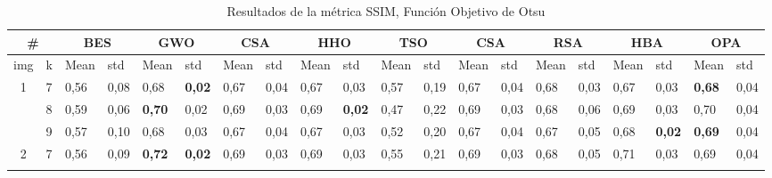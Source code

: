 \documentclass[conference]{IEEEtran}
\begin{document}
\begin{table*}[]
	\caption{Resultados de la métrica SSIM, Función Objetivo de Otsu}
	\begin{tabular}{|cl|ll|ll|ll|ll|ll|ll|ll|ll|ll|}
		\hline
		\multicolumn{2}{|c|}{\#} & \multicolumn{2}{c|}{BES} & \multicolumn{2}{c|}{GWO} & \multicolumn{2}{c|}{CSA} & \multicolumn{2}{c|}{HHO} & \multicolumn{2}{c|}{TSO} & \multicolumn{2}{c|}{CSA} & \multicolumn{2}{c|}{RSA} & \multicolumn{2}{c|}{HBA} & \multicolumn{2}{c|}{OPA} \\ \hline
		\multicolumn{1}{|l|}{img} & k & \multicolumn{1}{l|}{Mean} & std & \multicolumn{1}{l|}{Mean} & std & \multicolumn{1}{l|}{Mean} & std & \multicolumn{1}{l|}{Mean} & std & \multicolumn{1}{l|}{Mean} & std & \multicolumn{1}{l|}{Mean} & std & \multicolumn{1}{l|}{Mean} & std & \multicolumn{1}{l|}{Mean} & std & \multicolumn{1}{l|}{Mean} & std \\ \hline
		\multicolumn{1}{|c|}{\multirow{3}{*}{1}} & 7 & \multicolumn{1}{l|}{0,56} & 0,08 & \multicolumn{1}{l|}{0,68} & \textbf{0,02} & \multicolumn{1}{l|}{0,67} & 0,04 & \multicolumn{1}{l|}{0,67} & 0,03 & \multicolumn{1}{l|}{0,57} & 0,19 & \multicolumn{1}{l|}{0,67} & 0,04 & \multicolumn{1}{l|}{0,68} & 0,03 & \multicolumn{1}{l|}{0,67} & 0,03 & \multicolumn{1}{l|}{\textbf{0,68}} & 0,04 \\ \cline{2-20} 
		\multicolumn{1}{|c|}{} & 8 & \multicolumn{1}{l|}{0,59} & 0,06 & \multicolumn{1}{l|}{\textbf{0,70}} & 0,02 & \multicolumn{1}{l|}{0,69} & 0,03 & \multicolumn{1}{l|}{0,69} & \textbf{0,02} & \multicolumn{1}{l|}{0,47} & 0,22 & \multicolumn{1}{l|}{0,69} & 0,03 & \multicolumn{1}{l|}{0,68} & 0,06 & \multicolumn{1}{l|}{0,69} & 0,03 & \multicolumn{1}{l|}{0,70} & 0,04 \\ \cline{2-20} 
		\multicolumn{1}{|c|}{} & 9 & \multicolumn{1}{l|}{0,57} & 0,10 & \multicolumn{1}{l|}{0,68} & 0,03 & \multicolumn{1}{l|}{0,67} & 0,04 & \multicolumn{1}{l|}{0,67} & 0,03 & \multicolumn{1}{l|}{0,52} & 0,20 & \multicolumn{1}{l|}{0,67} & 0,04 & \multicolumn{1}{l|}{0,67} & 0,05 & \multicolumn{1}{l|}{0,68} & \textbf{0,02} & \multicolumn{1}{l|}{\textbf{0,69}} & 0,04 \\ \hline
		\multicolumn{1}{|c|}{\multirow{3}{*}{2}} & 7 & \multicolumn{1}{l|}{0,56} & 0,09 & \multicolumn{1}{l|}{\textbf{0,72}} & \textbf{0,02} & \multicolumn{1}{l|}{0,69} & 0,03 & \multicolumn{1}{l|}{0,69} & 0,03 & \multicolumn{1}{l|}{0,55} & 0,21 & \multicolumn{1}{l|}{0,69} & 0,03 & \multicolumn{1}{l|}{0,68} & 0,05 & \multicolumn{1}{l|}{0,71} & 0,03 & \multicolumn{1}{l|}{0,69} & 0,04 \\ \cline{2-20} 

\end{tabular}
\end{table*}
\end{document}
